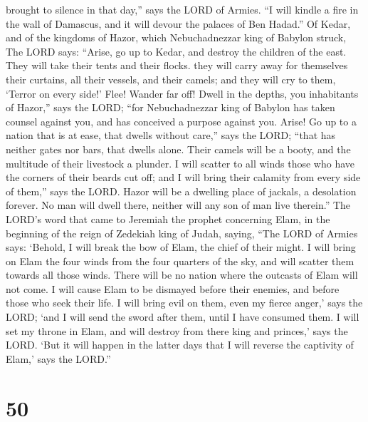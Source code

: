 brought to silence in that day,'' says the LORD of Armies.
 ``I will kindle a fire in the wall of Damascus, and it
will devour the palaces of Ben Hadad.''  Of Kedar, and of
the kingdoms of Hazor, which Nebuchadnezzar king of Babylon struck, The
LORD says: ``Arise, go up to Kedar, and destroy the children of the
east.  They will take their tents and their flocks. they
will carry away for themselves their curtains, all their vessels, and
their camels; and they will cry to them, `Terror on every side!'
 Flee! Wander far off! Dwell in the depths, you
inhabitants of Hazor,'' says the LORD; ``for Nebuchadnezzar king of
Babylon has taken counsel against you, and has conceived a purpose
against you.  Arise! Go up to a nation that is at ease,
that dwells without care,'' says the LORD; ``that has neither gates nor
bars, that dwells alone.  Their camels will be a booty,
and the multitude of their livestock a plunder. I will scatter to all
winds those who have the corners of their beards cut off; and I will
bring their calamity from every side of them,'' says the LORD.
 Hazor will be a dwelling place of jackals, a desolation
forever. No man will dwell there, neither will any son of man live
therein.''  The LORD's word that came to Jeremiah the
prophet concerning Elam, in the beginning of the reign of Zedekiah king
of Judah, saying,  ``The LORD of Armies says: `Behold, I
will break the bow of Elam, the chief of their might.  I
will bring on Elam the four winds from the four quarters of the sky, and
will scatter them towards all those winds. There will be no nation where
the outcasts of Elam will not come.  I will cause Elam to
be dismayed before their enemies, and before those who seek their life.
I will bring evil on them, even my fierce anger,' says the LORD; `and I
will send the sword after them, until I have consumed them.
 I will set my throne in Elam, and will destroy from
there king and princes,' says the LORD.  `But it will
happen in the latter days that I will reverse the captivity of Elam,'
says the LORD.''

\hypertarget{section-49}{%
\section{50}\label{section-49}}

